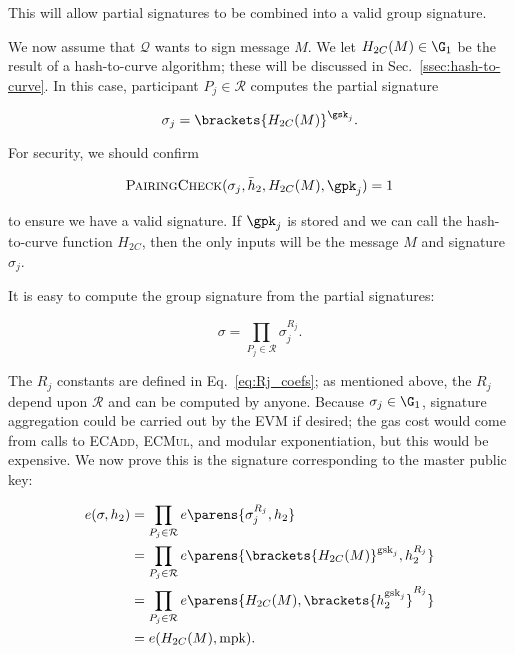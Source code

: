 \noindent
This will allow partial signatures to be combined into a valid
group signature.

We now assume that $\mathcal{Q}$ wants to sign message $M$.
We let $H_{2C}(M)\in\G_{1}$ be the result of a hash-to-curve algorithm;
these will be discussed in Sec.~\ref{ssec:hash-to-curve}.
In this case, participant $P_{j}\in\mathcal{R}$ computes the
partial signature

\begin{equation}
    \sigma_{j} = \brackets{H_{2C}(M)}^{\gsk_{j}}.
\end{equation}

\noindent
For security, we should confirm

\begin{equation}
    \textsc{PairingCheck}(\sigma_{j},\bar{h}_{2},H_{2C}(M),\gpk_{j}) = 1
\end{equation}

\noindent
to ensure we have a valid signature.
If $\gpk_{j}$ is stored and we can call the hash-to-curve function $H_{2C}$,
then the only inputs will be the message $M$
and signature $\sigma_{j}$.

It is easy to compute the group signature from the partial signatures:

\begin{equation}
    \sigma = \prod_{P_{j}\in\mathcal{R}} \sigma_{j}^{R_{j}}.
\end{equation}

\noindent
The $R_{j}$ constants are defined in Eq.~\eqref{eq:Rj_coefs};
as mentioned above, the $R_{j}$ depend upon $\mathcal{R}$
and can be computed by anyone.
Because $\sigma_{j}\in\G_{1}$, signature aggregation could be carried
out by the EVM if desired; the gas cost would come from calls to
\textsc{ECAdd}, \textsc{ECMul}, and modular exponentiation,
but this would be expensive.
We now prove this is the signature corresponding to the master public key:

\begin{align}
    e(\sigma, h_{2})
        &= \prod_{P_{j}\in\mathcal{R}}
            e\parens{\sigma_{j}^{R_{j}},h_{2}}
            \nonumber\\
        &= \prod_{P_{j}\in\mathcal{R}}
            e\parens{\brackets{H_{2C}(M)}^{\text{gsk}_{j}},h_{2}^{R_{j}}}
            \nonumber\\
        &= \prod_{P_{j}\in\mathcal{R}} e\parens{H_{2C}(M),
                \brackets{h_{2}^{\text{gsk}_{j}}}^{R_{j}}} \nonumber\\
        &= e(H_{2C}(M),\text{mpk}).
\end{align}

